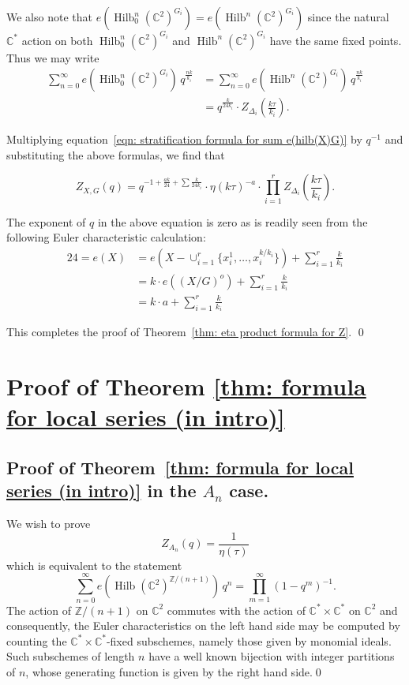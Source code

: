 \documentclass{article}
\theoremstyle{definition}
\newcommand{\CC} {{\mathbb C}}          %
\newcommand{\ZZ} {{\mathbb Z}}		%
\newcommand{\Hilb}{\operatorname{Hilb}}
\begin{document}
We also note that $e\left(\Hilb_{0}^{n}(\CC^{2})^{G_{i}}
\right)=e\left(\Hilb^{n}(\CC^{2})^{G_{i}} \right)$ since the natural
$\CC^{*}$ action on both $\Hilb_{0}^{n}(\CC^{2})^{G_{i}}$ and
$\Hilb^{n}(\CC^{2})^{G_{i}}$ have the same fixed points. Thus we may
write
\begin{align*}
\sum_{n=0}^{\infty} e\left(\Hilb_{0}^{n}(\CC^{2})^{G_{i}} \right) \,
q^{\frac{nk}{k_{i}}} &= \sum_{n=0}^{\infty} e\left(\Hilb^{n}(\CC^{2})^{G_{i}} \right) \,
q^{\frac{nk}{k_{i}}}\\
&= q^{\frac{k}{24k_{i}}} \cdot Z_{\Delta_{i}} \left(\frac{k\tau}{k_{i}}
\right) .
\end{align*}

Multiplying equation~\eqref{eqn: stratification formula for sum
e(hilb(X)G)} by $q^{-1}$ and substituting the above formulas, we find
that

\[
Z_{X,G}(q) = q^{-1 +\frac{ak}{24} + \sum \frac{k}{24k_{i}} } \cdot 
\eta (k\tau )^{-a}\cdot 
\prod_{i=1}^{r}Z_{\Delta_{i}}\left(\frac{k\tau}{k_{i}} \right) .
\]

The exponent of $q$ in the above equation is zero as is readily seen
from the following Euler characteristic calculation:
\begin{align*}
24 = e(X) &= e\left(X-\cup_{i=1}^{r} \{x_{i}^{1},\dotsc
,x_{i}^{k/k_{i}} \} \right) + \sum_{i=1}^{r} \frac{k}{k_{i}} \\
&= k \cdot e\left((X/G)^{o} \right) + \sum_{i=1}^{r} \frac{k}{k_{i}} \\
&= k\cdot a + \sum_{i=1}^{r}\frac{k}{k_{i}} 
\end{align*}

This completes the proof of Theorem~\ref{thm: eta product formula for
Z}.  \qed


\section{Proof of Theorem \ref{thm: formula for local series (in
intro)}}\label{sec: proof of formula for local series}

\subsection{Proof of Theorem~\ref{thm: formula for local series (in
intro)} in the $A_{n}$ case.}\label{subsec: proof of An case of
local series}

We wish to prove
\[
Z_{A_{n}}(q) = \frac{1}{\eta (\tau )}
\]
which is equivalent to the statement
\[
\sum_{n=0}^{\infty} e\left(\Hilb (\CC^{2})^{\ZZ /(n+1)} \right)
\,q^{n} = \prod_{m=1}^{\infty} (1-q^{m})^{-1}.
\]
The action of $\ZZ /(n+1)$ on $\CC^{2}$ commutes with the action of
$\CC^{*}\times \CC^{*}$ on $\CC^{2}$ and consequently, the Euler
characteristics on the left hand side may be computed by counting
the $\CC^{*}\times \CC^{*}$-fixed subschemes, namely those given by
monomial ideals. Such subschemes of length $n$ have a well known
bijection with integer partitions of $n$, whose generating function is
given by the right hand side.\qed 
\end{document}
